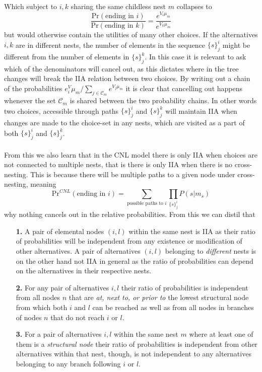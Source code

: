Which subject to $i,k$ sharing the same childless nest $m$ collapses to
\begin{equation}
    \frac{\textrm{Pr}(\textrm{ending in }i)}{\textrm{Pr}(\textrm{ending in }k)} =
    \frac{e^{V_i \mu_m}}{e^{V_k \mu_m}}
\end{equation}
but would otherwise contain the utilities of many other choices. If the alternatives $i,k$ are in different nests, the number of elements in the sequence $\{s\}_{j}^{i}$ might be different from the number of elements in $\{s\}_{j}^{k}$. In this case it is relevant to ask which of the denominators will cancel out, as this dictates where in the tree changes will break the IIA relation between two choices. By writing out a chain of the probabilities $e^V_i\mu_m / \sum_{j \in  \mathcal{C}_m} e^{V_j \mu_m}$ it is clear that cancelling out happens whenever the set $\mathcal{C}_m$ is shared between the two probability chains. In other words two choices, accessible through paths $\{s\}_{j}^{i}$ and $\{s\}_{j}^{k}$ will maintain IIA when changes are made to the choice-set in any nests, which are visited as a part of both $\{s\}_{j}^{i}$ and $\{s\}_{j}^{k}$.
\\ \\
From this we also learn that in the CNL model there is only IIA when choices are not connected to multiple nests, that is there is only IIA when there is no cross-nesting. This is because there will be multiple paths to a given node under cross-nesting, meaning
\begin{equation}
\textrm{Pr}^{CNL}(\textrm{ending in }i) = \sum_{\textrm{possible paths to }i} \prod_{\{s\}_{j}^{i}} P(s|m_s)
\end{equation}
why nothing cancels out in the relative probabilities. From this we can distil that
\begin{itemize}
  \item[\textbf{1.}] A pair of elemental nodes $(i,l)$ within the same nest is IIA as their ratio of probabilities will be independent from any existence or modification of other alternatives. A pair of alternatives $(i,l)$ belonging to \textit{different} nests is on the other hand not IIA in general as the ratio of probabilities can depend on the alternatives in their respective nests.
  \item[\textbf{2.}] For any pair of alternatives $i,l$ their ratio of probabilities is independent from all nodes $n$ that are \textit{at, next to, or prior to} the lowest structural node from which both $i$ and $l$ can be reached as well as from all nodes in branches of nodes $n$ that do not reach $i$ or $l$.
  \item[\textbf{3.}] For a pair of alternatives $i,l$ within the same nest $m$ where at least one of them is a \textit{structural node} their ratio of probabilities is independent from other alternatives within that nest, though, is not independent to any alternatives belonging to any branch following $i$ or $l$.
\end{itemize}
